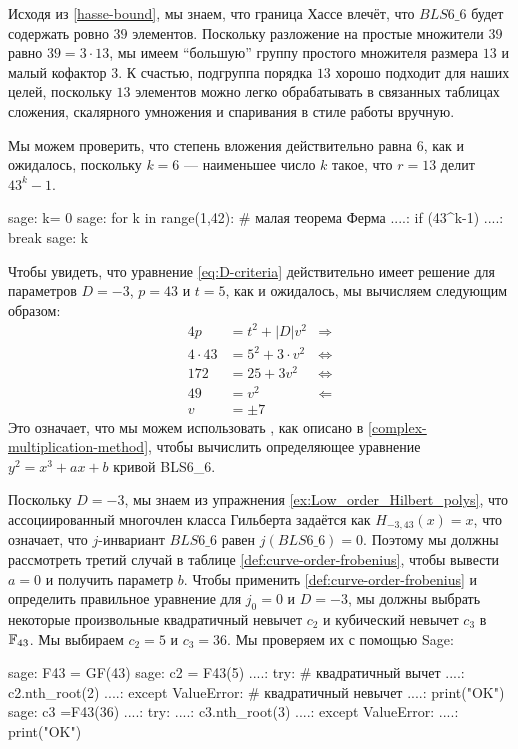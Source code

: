Исходя из \ref{hasse-bound}, мы знаем, что граница Хассе влечёт, что $BLS6\_6$ будет содержать ровно $39$ элементов. Поскольку разложение на простые множители $39$ равно $39=3\cdot 13$, мы имеем ``большую'' группу простого множителя размера $13$ и малый кофактор $3$. К счастью, подгруппа порядка $13$ хорошо подходит для наших целей, поскольку $13$ элементов можно легко обрабатывать в связанных таблицах сложения, скалярного умножения и спаривания в стиле работы вручную. 

Мы можем проверить, что степень вложения действительно равна $6$, как и ожидалось, поскольку $k = 6$ — наименьшее число $k$ такое, что $r=13$ делит $43^k-1$. 
\begin{sagecommandline}
sage: k= 0
sage: for k in range(1,42): # малая теорема Ферма
....:     if (43^k-1)%
....:         break
sage: k
\end{sagecommandline}

Чтобы увидеть, что уравнение \ref{eq:D-criteria} действительно имеет решение для параметров $D=-3$, $p=43$ и $t=5$, как и ожидалось, мы вычисляем следующим образом:  
\begin{align*}
4p & = t^2 + |D|v^2 & \Rightarrow \\ 
4\cdot 43 & = 5^2 + 3\cdot v^2 & \Leftrightarrow \\ 
172 & = 25 + 3 v^2 & \Leftrightarrow \\ 
49 & = v^2 & \Leftarrow \\
v & = \pm 7
\end{align*}
Это означает, что мы можем использовать , как описано в \ref{complex-multiplication-method}, чтобы вычислить определяющее уравнение $y^2=x^3 + ax + b$ кривой BLS6\_6. 

Поскольку $D=-3$, мы знаем из упражнения \ref{ex:Low_order_Hilbert_polys}, что ассоциированный многочлен класса Гильберта задаётся как $H_{-3,43}(x) = x$, что означает, что $j$-инвариант $BLS6\_6$ равен $j(BLS6\_6)=0$. Поэтому мы должны рассмотреть третий случай в таблице \ref{def:curve-order-frobenius}, чтобы вывести $a=0$ и получить параметр $b$. Чтобы применить \ref{def:curve-order-frobenius} и определить правильное уравнение для $j_0=0$ и $D=-3$, мы должны выбрать некоторые произвольные квадратичный невычет $c_2$ и кубический невычет $c_3$ в $\mathbb{F}_{43}$. Мы выбираем $c_2 =5$ и $c_3=36$. Мы проверяем их с помощью Sage:
\begin{sagecommandline}
sage: F43 = GF(43)
sage: c2 = F43(5)
....: try: # квадратичный вычет
....:     c2.nth_root(2)
....: except ValueError: # квадратичный невычет
....:     print("OK") 
sage: c3 =F43(36)
....: try:
....:     c3.nth_root(3)
....: except ValueError:
....:     print("OK") 
\end{sagecommandline} 

